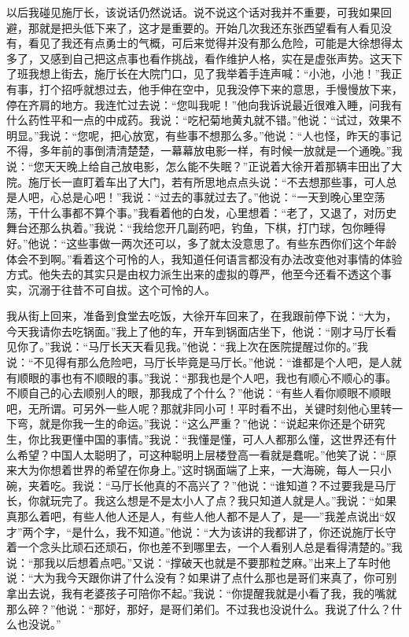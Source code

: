 \documentclass[12pt,oneside]{book}
\begin{document}
以后我碰见施厅长，该说话仍然说话。说不说这个话对我并不重要，可我如果回避，那就是把头低下来了，这才是重要的。开始几次我还东张西望看有人看见没有，看见了我还有点勇士的气概，可后来觉得并没有那么危险，可能是大徐想得太多了，又感到自己把这点事也看作挑战，看作维护人格，实在是虚张声势。这天下了班我想上街去，施厅长在大院门口，见了我举着手连声喊：``小池，小池！''我正有事，打个招呼就想过去，他手伸在空中，见我没停下来的意思，手慢慢放下来，停在齐肩的地方。我连忙过去说：``您叫我呢！''他向我诉说最近很难入睡，问我有什么药性平和一点的中成药。我说：``吃杞菊地黄丸就不错。''他说：``试过，效果不明显。''我说：``您呢，把心放宽，有些事不想那么多。''他说：``人也怪，昨天的事记不得，多年前的事倒清清楚楚，一幕幕放电影一样，有时候一放就是一个通晚。''我说：``您天天晚上给自己放电影，怎么能不失眠？''正说着大徐开着那辆丰田出了大院。施厅长一直盯着车出了大门，若有所思地点点头说：``不去想那些事，可人总是人吧，心总是心吧！''我说：``过去的事就过去了。''他说：``一天到晚心里空荡荡，干什么事都不算个事。''我看着他的白发，心里想着：``老了，又退了，对历史舞台还那么执着。''我说：``我给您开几副药吧，钓鱼，下棋，打门球，包你睡得好。''他说：``这些事做一两次还可以，多了就太没意思了。有些东西你们这个年龄体会不到啊。''看着这个可怜的人，我知道任何语言都没有办法改变他对事情的体验方式。他失去的其实只是由权力派生出来的虚拟的尊严，他至今还看不透这个事实，沉溺于往昔不可自拔。这个可怜的人。

我从街上回来，准备到食堂去吃饭，大徐开车回来了，在我跟前停下说：``大为，今天我请你去吃锅面。''我上了他的车，开车到锅面店坐下，他说：``刚才马厅长看见你了。''我说：``马厅长天天看见我。''他说：``我上次在医院提醒过你的。''我说：``不见得有那么危险吧，马厅长毕竟是马厅长。''他说：``谁都是个人吧，是人就有顺眼的事也有不顺眼的事。''我说：``那我也是个人吧，我也有顺心不顺心的事。不顺自己的心去顺别人的眼，那我成了个什么？''他说：``有些人看你顺眼不顺眼吧，无所谓。可另外一些人呢？那就非同小可！平时看不出，关键时刻他心里转一下弯，就是你我一生的命运。''我说：``这么严重？''他说：``说起来你还是个研究生，你比我更懂中国的事情。''我说：``我懂是懂，可人人都那么懂，这世界还有什么希望？中国人太聪明了，可这种聪明上层楼登高一看就是蠢呢。''他笑了说：``原来大为你想着世界的希望在你身上。''这时锅面端了上来，一大海碗，每人一只小碗，夹着吃。我说：``马厅长他真的不高兴了？''他说：``谁知道？不过要我是马厅长，你就玩完了。我这么想是不是太小人了点？我只知道人就是人。''我说：``如果真那么着吧，有些人他人还是人，有些人他人都不是人了，是──''我差点说出``奴才''两个字，``是什么，我不知道。''他说：``大为该讲的我都讲了，你还说施厅长守着一个念头比顽石还顽石，你也差不到哪里去，一个人看别人总是看得清楚的。''我说：``那我以后想着点吧。''又说：``撑破天也就是不要那粒芝麻。''出来上了车时他说：``大为我今天跟你讲了什么没有？如果讲了点什么那也是哥们来真了，你可别拿出去说，我有老婆孩子可陪你不起。''我说：``你提醒我就是小看了我，我的嘴就那么碎？''他说：``那好，那好，是哥们弟们。不过我也没说什么。我说了什么？什么也没说。''
\end{document}
